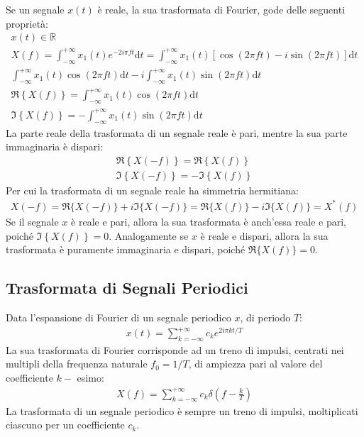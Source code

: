 \documentclass{article}
\newcommand{\df}{\mathrm{d}}
\numberwithin{equation}{subsection}
\begin{document}
Se un segnale $x(t)$ è reale, la sua trasformata di Fourier, gode delle seguenti proprietà:
\begin{gather*}
    x(t)\in\mathbb{R}\\
    X(f)=\displaystyle\int_{-\infty}^{+\infty}x_1(t)e^{-2i\pi ft}\df t=\int_{-\infty}^{+\infty}x_1(t)\left[\cos(2\pi ft)-i\sin(2\pi ft)\right]\df t\\
    \displaystyle\int_{-\infty}^{+\infty}x_1(t)\cos(2\pi ft)\df t-i\int_{-\infty}^{+\infty}x_1(t)\sin(2\pi ft)\df t\\
    \Re\left\{X(f)\right\}=\displaystyle\int_{-\infty}^{+\infty}x_1(t)\cos(2\pi ft)\df t\\
    \Im\left\{X(f)\right\}=\displaystyle-\int_{-\infty}^{+\infty}x_1(t)\sin(2\pi ft)\df t
\end{gather*}
La parte reale della trasformata di un segnale reale è pari, mentre la sua parte immaginaria è dispari:
\begin{gather*}
    \Re\left\{X(-f)\right\}=\Re\left\{X(f)\right\}\\
    \Im\left\{X(-f)\right\}=-\Im\left\{X(f)\right\}
\end{gather*}
Per cui la trasformata di un segnale reale ha simmetria hermitiana:
\begin{gather*}
    X(-f)=\Re\{X(-f)\}+i\Im\{X(-f)\}=\Re\{X(f)\}-i\Im\{X(f)\}=X^*(f)
\end{gather*}
Se il segnale $x$ è reale e pari, allora la sua trasformata è anch'essa reale e pari, poiché $\Im\left\{X(f)\right\}=0$. 
Analogamente se $x$ è reale e dispari, allora la sua trasformata è puramente immaginaria e dispari, poiché $\Re\{X(f)\}=0$. 

\subsection{Trasformata di Segnali Periodici}

Data l'espansione di Fourier di un segnale periodico $x$, di periodo $T$:
\begin{gather*}
    x(t)=\displaystyle\sum_{k=-\infty}^{+\infty}c_ke^{2i\pi kt/T}
\end{gather*}
La sua trasformata di Fourier corrisponde ad un treno di impulsi, centrati nei multipli della frequenza naturale $f_0=1/T$, di ampiezza pari al valore del coefficiente $k-$
esimo: 
\begin{gather*}
    X(f)=\displaystyle\sum_{k=-\infty}^{+\infty}c_k\delta\left(f-\frac{k}{T}\right)
\end{gather*}
La trasformata di un segnale periodico è sempre un treno di impulsi, moltiplicati ciascuno per un coefficiente $c_k$.
\end{document}
